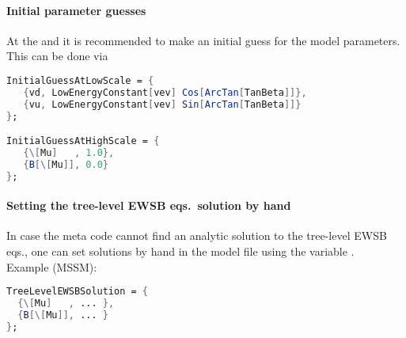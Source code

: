 \paragraph{Initial parameter guesses} At the  and
 it is recommended to make an initial guess for the
model parameters.  This can be done via
\begin{lstlisting}[language=Mathematica]
InitialGuessAtLowScale = {
   {vd, LowEnergyConstant[vev] Cos[ArcTan[TanBeta]]},
   {vu, LowEnergyConstant[vev] Sin[ArcTan[TanBeta]]}
};

InitialGuessAtHighScale = {
   {\[Mu]   , 1.0},
   {B[\[Mu]], 0.0}
};
\end{lstlisting}

\paragraph{Setting the tree-level EWSB eqs.\ solution by hand} In case
the meta code cannot find an analytic solution to the tree-level EWSB
eqs., one can set solutions by hand in the model file using the
variable .
\\
Example (MSSM):
\begin{lstlisting}[language=Mathematica]
TreeLevelEWSBSolution = {
  {\[Mu]   , ... },
  {B[\[Mu]], ... }
};
\end{lstlisting}

